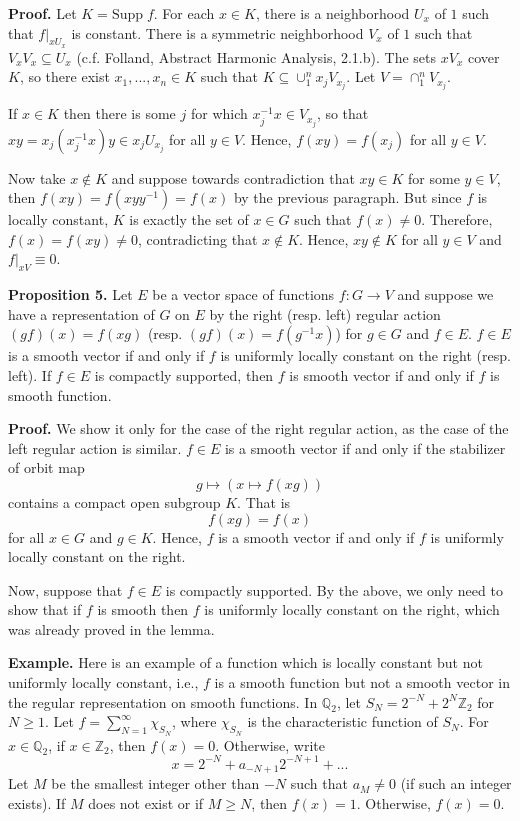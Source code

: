 \documentclass[12pt]{article}
\begin{document}
\textbf{Proof.} Let $K = \text{Supp} \; f$. For each $x \in K$, there is a
neighborhood $U_{x}$ of $1$ such that $f|_{xU_{x}}$ is constant. There is a
symmetric neighborhood $V_{x}$ of $1$ such that $V_{x} V_{x} \subseteq U_{x}$
(c.f. Folland, Abstract Harmonic Analysis, 2.1.b). The sets $x V_{x}$ cover $K$,
so there exist $x_1, ..., x_{n} \in K$ such that $K \subseteq \cup_{1}^{n}
x_{j}V_{x_{j}}$. Let $V = \cap_{1}^{n} V_{x_{j}}$.

If $x \in K$ then there is some $j$ for which $x_{j}^{-1} x \in V_{x_{j}}$, so
that $xy = x_{j}\left(x_{j}^{-1}x\right)y \in x_{j}U_{x_{j}}$ for all $y \in V$.
Hence, $f\left(xy\right) = f\left(x_{j}\right)$ for all $y \in V$.

Now take $x \not\in K$ and suppose towards contradiction that $xy \in K$ for
some $y \in V$, then $f\left(xy\right) = f\left(xyy^{-1}\right) =
f\left(x\right)$ by the previous paragraph. But since $f$ is locally constant,
$K$ is exactly the set of $x \in G$ such that $f\left(x\right) \neq 0$.
Therefore, $f\left(x\right) = f\left(xy\right) \neq 0$, contradicting that $x
\not\in K$. Hence, $xy \not\in K$ for all $y \in V$ and $f|_{xV} \equiv 0$.

\textbf{Proposition 5.} Let $E$ be a vector space of functions $f : G
\rightarrow V$ and suppose we have a representation of $G$ on $E$ by the right
(resp. left) regular action $\left(gf\right)\left(x\right) = f\left(xg\right)$
(resp. $\left(gf\right)\left(x\right) = f\left(g^{-1}x\right)$) for $g \in G$
and $f \in E$. $f \in E$ is a smooth vector if and only if $f$ is uniformly
locally constant on the right (resp. left). If $f \in E$ is compactly supported,
then $f$ is smooth vector if and only if $f$ is smooth function. 

\textbf{Proof.} We show it only for the case of the right regular action, as the
case of the left regular action is similar. $f \in E$ is a smooth vector if and
only if the stabilizer of orbit map 
%
\[g \mapsto \left(x \mapsto f\left(xg\right)\right)\]
%
contains a compact open subgroup $K$. That is 
%
\[f\left(xg\right) = f\left(x\right)\]
%
for all $x \in G$ and $g \in K$. Hence, $f$ is a smooth vector if and only if
$f$ is uniformly locally constant on the right.

Now, suppose that $f \in E$ is compactly supported. By the above, we only need
to show that if $f$ is smooth then $f$ is uniformly locally constant on the
right, which was already proved in the lemma. 

\textbf{Example.} Here is an example of a function which is locally constant but
not uniformly locally constant, i.e., $f$ is a smooth function but not a smooth
vector in the regular representation on smooth functions. In $\mathbb{Q}_{2}$,
let $S_{N} = 2^{-N} + 2^{N}\mathbb{Z}_{2}$ for $N \geq 1$. Let $f = \sum_{N =
1}^{\infty} \chi_{S_{N}}$, where $\chi_{S_{N}}$ is the characteristic function
of $S_{N}$. For $x \in \mathbb{Q}_{2}$, if $x \in \mathbb{Z}_{2}$, then
$f\left(x\right) = 0$. Otherwise, write
%
\[x = 2^{-N} + a_{-N + 1} 2^{-N + 1} + ...\]
%
Let $M$ be the smallest integer other than $-N$ such that $a_{M} \neq 0$ (if
such an integer exists). If $M$ does not exist or if $M \geq N$, then
$f\left(x\right) = 1$. Otherwise, $f\left(x\right) = 0$. 
\end{document}
